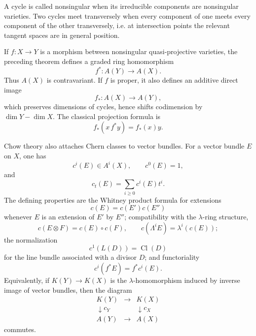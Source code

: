 \documentclass[14pt]{extarticle}
\newcommand{\Cl}{\operatorname{Cl}}
\begin{document}
A cycle is called nonsingular when its irreducible components are nonsingular varieties. Two cycles meet transversely when every component of one meets every component of the other transversely, i.e. at intersection points the relevant tangent spaces are in general position.

If $f:X\to Y$ is a morphism between nonsingular quasi-projective varieties, the preceding theorem defines a graded ring homomorphism
\begin{equation}\label{eq:Chowpull}
   f^*:A(Y)\to A(X).
\end{equation}
Thus $A(X)$ is contravariant. If $f$ is proper, it also defines an additive direct image
\begin{equation}\label{eq:Chowpush}
   f_*:A(X)\to A(Y),
\end{equation}
which preserves dimensions of cycles, hence shifts codimension by $\dim Y-\dim X$. The classical projection formula is
\begin{equation}\label{eq:projectionChow}
   f_*(x\,f^*y)=f_*(x)y.
\end{equation}

Chow theory also attaches Chern classes to vector bundles. For a vector bundle $E$ on $X$, one has
\[
   c^i(E)\in A^i(X),\qquad c^0(E)=1,
\]
and
\[
   c_t(E)=\sum_{i\geq0}c^i(E)t^i.
\]
The defining properties are the Whitney product formula for extensions
\begin{equation}\label{eq:Whitney}
   c(E)=c(E')c(E'')
\end{equation}
whenever $E$ is an extension of $E'$ by $E''$; compatibility with the $\lambda$-ring structure,
\begin{equation}\label{eq:lambdaChern}
   c(E\otimes F)=c(E)\circ c(F),
   \qquad
   c(\Lambda^iE)=\lambda^i(c(E));
\end{equation}
the normalization
\begin{equation}\label{eq:divisorChern}
   c^1(L(D))=\Cl(D)
\end{equation}
for the line bundle associated with a divisor $D$; and functoriality
\begin{equation}\label{eq:chernfunctorial}
   c^i(f^*E)=f^*c^i(E).
\end{equation}
Equivalently, if $K(Y)\to K(X)$ is the $\lambda$-homomorphism induced by inverse image of vector bundles, then the diagram
\[
\begin{array}{ccc}
K(Y) & \longrightarrow & K(X) \\
\downarrow c_Y & & \downarrow c_X \\
A(Y) & \longrightarrow & A(X)
\end{array}
\]
commutes.
\end{document}
